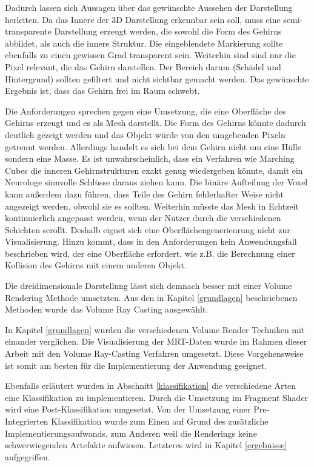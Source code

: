 Dadurch lassen sich Aussagen über das gewünschte Aussehen der Darstellung herleiten.
Da das Innere der 3D Darstellung erkennbar sein soll, muss eine semi-transparente Darstellung erzeugt werden, die sowohl die Form des Gehirns abbildet, als auch die innere Struktur. Die eingeblendete Markierung sollte ebenfalls zu einen gewissen Grad transparent sein.
Weiterhin sind sind nur die Pixel relevant, die das Gehirn darstellen. Der Bereich darum (Schädel und Hintergrund) sollten gefiltert  und nicht sichtbar gemacht werden. Das gewünschte Ergebnis ist, dass das Gehirn frei im Raum schwebt. 

Die Anforderungen sprechen gegen eine Umsetzung, die eine Oberfläche des Gehirns erzeugt und es als Mesh darstellt. Die Form des Gehirns könnte dadurch deutlich gezeigt werden und das Objekt würde von den umgebenden Pixeln getrennt werden. 
Allerdings handelt es sich bei dem Gehirn nicht um eine Hülle sondern eine Masse. Es ist unwahrscheinlich, dass ein Verfahren wie Marching Cubes die inneren Gehirnstrukturen exakt genug wiedergeben könnte, damit ein Neurologe sinnvolle Schlüsse daraus ziehen kann. Die binäre Aufteilung der Voxel kann außerdem dazu führen, dass Teile des Gehirn fehlerhafter Weise nicht angezeigt werden, obwohl sie es sollten. Weiterhin müsste das Mesh in Echtzeit kontinuierlich angepasst werden, wenn der Nutzer durch die verschiedenen Schichten scrollt. 
Deshalb eignet sich eine Oberflächengenerieurung nicht zur Visualisierung.
Hinzu kommt, dass in den Anforderungen kein Anwendungsfall beschrieben wird, der eine Oberfläche erfordert, wie z.B. die Berechnung einer Kollision des Gehirns mit einem anderen Objekt.	
	
Die dreidimensionale Darstellung lässt sich demnach besser mit einer Volume Rendering Methode umsetzten. 
Aus den in Kapitel \ref{grundlagen} beschriebenen Methoden wurde das Volume Ray Casting ausgewählt. 


In Kapitel \ref{grundlagen} wurden die verschiedenen Volume Render Techniken mit einander verglichen.
Die Visualisierung der MRT-Daten wurde im Rahmen dieser Arbeit mit den Volume Ray-Casting Verfahren umgesetzt.
Diese Vorgehensweise ist somit am besten für die Implementierung der Anwendung geeignet.

Ebenfalls erläutert wurden in Abschnitt \ref{klassifikation} die verschiedene Arten eine Klassifikation zu implementieren. Durch die Umsetzung im Fragment Shader wird eine Post-Klassifikation umgesetzt. 
Von der Umsetzung einer Pre-Integrierten Klassifikation wurde zum Einen auf Grund des zusätzliche Implementierungsaufwands, zum Anderen weil die Renderings keine schwerwiegenden Artefakte aufwiesen. Letzteres wird in Kapitel \ref{ergebnisse} aufgegriffen.


